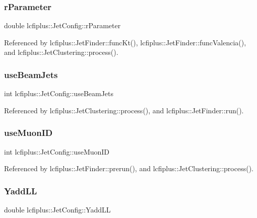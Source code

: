 \mbox{\label{structlcfiplus_1_1JetConfig_a1a01504e890049f4043ca522dfb76029}} 
\subsubsection{r\+Parameter}
{\footnotesize\ttfamily double lcfiplus\+::\+Jet\+Config\+::r\+Parameter}



Referenced by lcfiplus\+::\+Jet\+Finder\+::func\+Kt(), lcfiplus\+::\+Jet\+Finder\+::func\+Valencia(), and lcfiplus\+::\+Jet\+Clustering\+::process().

\mbox{\label{structlcfiplus_1_1JetConfig_a489551d988283323d47c6e5b71b6f6dc}} 
\subsubsection{use\+Beam\+Jets}
{\footnotesize\ttfamily int lcfiplus\+::\+Jet\+Config\+::use\+Beam\+Jets}



Referenced by lcfiplus\+::\+Jet\+Clustering\+::process(), and lcfiplus\+::\+Jet\+Finder\+::run().

\mbox{\label{structlcfiplus_1_1JetConfig_a9dfb6be88b4005fd63d355cbf364f5db}} 
\subsubsection{use\+Muon\+ID}
{\footnotesize\ttfamily int lcfiplus\+::\+Jet\+Config\+::use\+Muon\+ID}



Referenced by lcfiplus\+::\+Jet\+Finder\+::prerun(), and lcfiplus\+::\+Jet\+Clustering\+::process().

\mbox{\label{structlcfiplus_1_1JetConfig_a2bcd351e8c1946190e717a1a341b5b6d}} 
\subsubsection{Yadd\+LL}
{\footnotesize\ttfamily double lcfiplus\+::\+Jet\+Config\+::\+Yadd\+LL}



